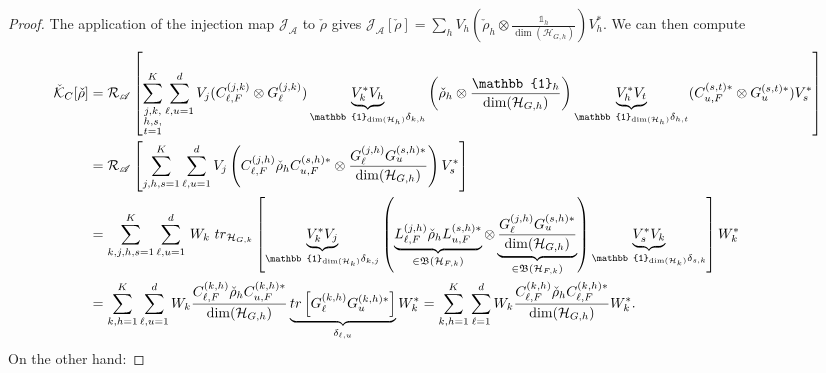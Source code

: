 \documentclass[aihp,12pt]{imsart}
\newcommand{\Hc}{\mathcal{H}}
\newcommand{\Jc}{\mathcal{J}}
\newcommand{\Rc}{\mathcal{R}}
\newcommand{\Kc}{\mathcal{K}}
\newcommand{\As}{\mathscr{A}}
\newcommand{\Bf}{\mathfrak{B}}
\newcommand{\one}{\mathbb{1}}
\newcommand{\tr}{{\rm tr}}
\theoremstyle{theorem}
\theoremstyle{definition}
\theoremstyle{remark}
\begin{document}
\begin{proof}
The application of the injection map $\Jc_\As$ to $\check{\rho}$ gives $\Jc_\As[\check{\rho}] = \sum_h V_h \left(\check{\rho}_h\otimes \frac{\one_h}{\dim(\Hc_{G,h})}\right) V_h^*$. 
We can then compute
\begin{align*}
    \check{\Kc}_C[\check{\rho}] &= \Rc_\As\left[ \sum_{\substack{j,k,\\h,s,\\t=1}}^K\sum_{\ell,u=1}^{d} V_j (C_{\ell,F}^{(j,k)}\otimes G_{\ell}^{(j,k)}) \underbrace{V_k^* V_h}_{\one_{\dim(\Hc_h)}\delta_{k,h}} \left(\check{\rho}_h\otimes \frac{\one_h}{\dim(\Hc_{G,h})}\right) \underbrace{V_h^* V_t}_{\one_{\dim(\Hc_h)}\delta_{h,t}} (C_{u,F}^{(s,t)*}\otimes G_{u}^{(s,t)*}) V_s^* \right]\\ 
    &= \Rc_\As\left[ \sum_{j,h,s=1}^K\sum_{\ell,u=1}^{d} V_j \left(C_{\ell,F}^{(j,h)} \check{\rho}_h C_{u,F}^{(s,h)*} \otimes \frac{G_{\ell}^{(j,h)} G_{u}^{(s,h)*}}{\dim(\Hc_{G,h})}\right) V_s^* \right]\\
    &= \sum_{k,j,h,s=1}^K\sum_{\ell,u=1}^{d} \, W_k \,\,\tr_{\Hc_{G,k}} \left[ \underbrace{V_k^* V_j}_{\one_{\dim(\Hc_k)}\delta_{k,j}} \left( \underbrace{L_{\ell,F}^{(j,h)} \check{\rho}_h L_{u,F}^{(s,h)*}}_{\in\Bf(\Hc_{F,k})} \otimes \underbrace{\frac{G_{\ell}^{(j,h)} G_{u}^{(s,h)*}}{\dim(\Hc_{G,h})}}_{\in\Bf(\Hc_{F,k})}\right) \underbrace{V_s^* V_k}_{\one_{\dim(\Hc_k)}\delta_{s,k}} \right] W_k^*\\
    &= \sum_{k,h=1}^K\sum_{\ell,u=1}^{d} W_k \frac{C_{\ell,F}^{(k,h)} \check{\rho}_h C_{u,F}^{(k,h)*}}{\dim(\Hc_{G,h})} \underbrace{\tr\left[G_{\ell}^{(k,h)} G_{u}^{(k,h)*}\right]}_{\delta_{\ell,u}} W_k^*
    = \sum_{k,h=1}^K \sum_{\ell=1}^{d} W_k \frac{C_{\ell,F}^{(k,h)} \check{\rho}_h C_{\ell,F}^{(k,h)*}}{\dim(\Hc_{G,h})} W_k^*.
\end{align*}
On the other hand:


\end{proof}
\end{document}
